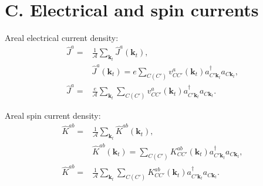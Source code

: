 \documentclass{article}
\begin{document}


\section{C. Electrical and spin currents} %
\label{sec:electrical_and_spin_currents}

Areal electrical current density:
\begin{align}\label{eq:areal_current}
    \hat{J}^{a} = & \frac{1}{\mathcal{A}} \sum_{\mathbf{k}_{t}} \hat{J}^{a}(\mathbf{k}_{t}), \nonumber \\
    & \hat{J}^{a}(\mathbf{k}_{t}) = e \sum_{C(C')}v^{a}_{CC'}(\mathbf{k}_{t})
    a^{\dag}_{C'\mathbf{k}_{t}} a_{C\mathbf{k}_{t}}, \nonumber \\
    \hat{J}^{a} = & \frac{e}{\mathcal{A}} \sum_{\mathbf{k}_{t}} \sum_{C(C')}v^{a}_{CC'}(\mathbf{k}_{t})
    a^{\dag}_{C'\mathbf{k}_{t}} a_{C\mathbf{k}_{t}}.
\end{align}

Areal spin current density:
\begin{align}\label{eq:areals_pin_current}
    \hat{K}^{ab} = & \frac{1}{\mathcal{A}} \sum_{\mathbf{k}_{t}} \hat{K}^{ab}(\mathbf{k}_{t}), \nonumber \\
    & \hat{K}^{ab}(\mathbf{k}_{t}) =   \sum_{C(C')}K^{ab}_{CC'}(\mathbf{k}_{t})
    a^{\dag}_{C'\mathbf{k}_{t}} a_{C\mathbf{k}_{t}}, \nonumber \\
    \hat{K}^{ab} = & \frac{1}{\mathcal{A}} \sum_{\mathbf{k}_{t}} \sum_{C(C')}K^{ab}_{CC'}(\mathbf{k}_{t})
    a^{\dag}_{C'\mathbf{k}_{t}} a_{C\mathbf{k}_{t}}.
\end{align}

\end{document}
